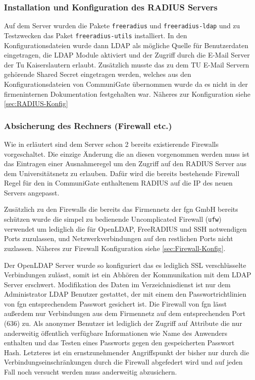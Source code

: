 \documentclass[11pt,a4paper,titlepage=firstiscover]{scrartcl} %
\begin{document}
\subsubsection{Installation und Konfiguration des RADIUS Servers}\label{sec:RADIUS-Konf}
Auf dem Server wurden die Pakete \texttt{freeradius} und \texttt{freeradius-ldap} und zu Testzwecken das Paket \texttt{freeradius-utils} installiert. In den Konfigurationsdateien wurde dann LDAP als mögliche Quelle für Benutzerdaten eingetragen, die LDAP Module aktiviert und der Zugriff durch die E-Mail Server der Tu Kaiserslautern erlaubt. Zusätzlich musste das zu dem TU E-Mail Servern gehörende Shared Secret eingetragen werden, welches aus den Konfigurationsdateien von CommuniGate übernommen wurde da es nicht in der firmeninternen Dokumentation festgehalten war. Näheres zur Konfiguration siehe \autoref{sec:RADIUS-Konfig}

\subsubsection{Absicherung des Rechners (Firewall etc.)}
Wie in  erläutert sind dem Server schon 2 bereits existierende Firewalls vorgeschaltet. Die einzige Änderung die an diesen vorgenommen werden muss ist das Eintragen einer Ausnahmeregel um den Zugriff auf den RADIUS Server aus dem Universitätsnetz zu erlauben. Dafür wird die bereits bestehende Firewall Regel für den in CommuniGate enthaltenem RADIUS auf die IP des neuen Servers angepasst.

Zusätzlich zu den Firewalls die bereits das Firmennetz der fgn GmbH bereits schützen wurde die simpel zu bedienende Uncomplicated Firewall (\texttt{ufw}) verwendet um lediglich die für OpenLDAP, FreeRADIUS und SSH notwendigen Ports zuzulassen, und Netzwerkverbindungen auf den restlichen Ports nicht zuzlassen. Näheres zur Firewall Konfiguration siehe \autoref{sec:Firewall-Konfig}.

Der OpenLDAP Server wurde so konfiguriert das es lediglich SSL verschlüsselte Verbindungen zulässt, somit ist ein Abhören der Kommunikation mit dem LDAP Server erschwert. Modifikation des Daten im Verzeichnisdienst ist nur dem Administrator LDAP Benutzer gestattet, der mit einem den Passwortrichtlinien von fgn entsprechendem Passwort gesichert ist. Die Firewall von fgn lässt außerdem nur Verbindungen aus dem Firmennetz auf dem entsprechenden Port (636) zu. Als anonymer Benutzer ist lediglich der Zugriff auf Attribute die nur anderweitig öffentlich verfügbare Informationen wie Name des Anwenders enthalten und das Testen eines Passworts gegen den gespeicherten Passwort Hash. Letzteres ist ein ernstzunehmender Angriffspunkt der bisher nur durch die Verbindungseinschränkungen durch die Firewall abgefedert wird und auf jeden Fall noch versucht werden muss anderweitig abzusichern.
\end{document}

